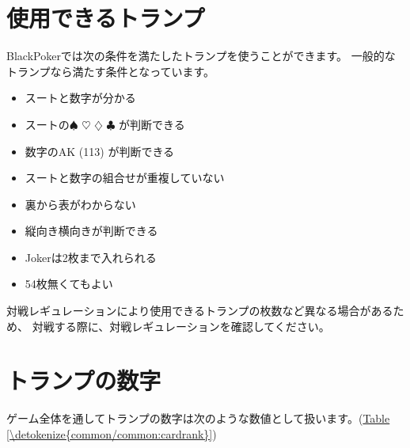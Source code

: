 \documentclass[letterpaper,10pt,dvipdfmx]{sphinxmanual}
\begin{document}
\section{使用できるトランプ}
\label{\detokenize{common/common:id4}}
\sphinxAtStartPar
BlackPokerでは次の条件を満たしたトランプを使うことができます。
一般的なトランプなら満たす条件となっています。
\begin{itemize}
\item {} 
\sphinxAtStartPar
スートと数字が分かる

\item {} 
\sphinxAtStartPar
スートの{\normalsize $\spadesuit$} {\normalsize $\heartsuit$} {\normalsize $\diamondsuit$} {\normalsize $\clubsuit$} が判断できる

\item {} 
\sphinxAtStartPar
数字のA\sphinxhyphen{}K (1\sphinxhyphen{}13) が判断できる

\item {} 
\sphinxAtStartPar
スートと数字の組合せが重複していない

\item {} 
\sphinxAtStartPar
裏から表がわからない

\item {} 
\sphinxAtStartPar
縦向き横向きが判断できる

\item {} 
\sphinxAtStartPar
Jokerは2枚まで入れられる

\item {} 
\sphinxAtStartPar
54枚無くてもよい

\end{itemize}

\sphinxAtStartPar
対戦レギュレーションにより使用できるトランプの枚数など異なる場合があるため、
対戦する際に、対戦レギュレーションを確認してください。


\section{トランプの数字}
\label{\detokenize{common/common:id5}}
\sphinxAtStartPar
ゲーム全体を通してトランプの数字は次のような数値として扱います。(\hyperref[\detokenize{common/common:cardrank}]{Table \ref{\detokenize{common/common:cardrank}}})
\end{document}
